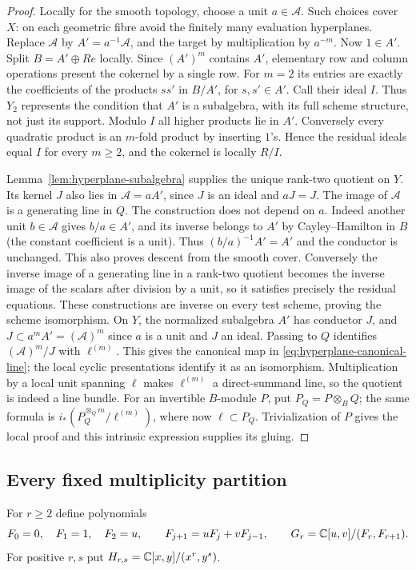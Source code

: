 \begin{proof}
Locally for the smooth topology, choose a unit $a\in\mathcal A$.
Such choices cover $X$: on each geometric fibre avoid the finitely
many evaluation hyperplanes. Replace $\mathcal A$ by
$A'=a^{-1}\mathcal A$, and the target by multiplication by $a^{-m}$.
Now $1\in A'$. Split $B=A'\oplus Re$ locally. Since $(A')^m$
contains $A'$, elementary row and column operations present the
cokernel by a single row. For $m=2$ its entries are exactly the
coefficients of the products $ss'$ in $B/A'$, for $s,s'\in A'$.
Call their ideal $I$. Thus $Y_2$ represents the condition that $A'$
is a subalgebra, with its full scheme structure, not just its support.
Modulo $I$ all higher products lie in $A'$. Conversely every
quadratic product is an $m$-fold product by inserting $1$'s.
Hence the residual ideals equal $I$ for every $m\ge2$, and the
cokernel is locally $R/I$.

Lemma~\ref{lem:hyperplane-subalgebra} supplies the unique rank-two
quotient on $Y$. Its kernel $J$ also lies in $\mathcal A=aA'$,
since $J$ is an ideal and $aJ=J$. The image of $\mathcal A$ is a
generating line in $Q$. The construction does not depend on $a$.
Indeed another unit $b\in\mathcal A$ gives $b/a\in A'$, and its
inverse belongs to $A'$ by Cayley--Hamilton in $B$ (the constant
coefficient is a unit). Thus $(b/a)^{-1}A'=A'$ and the conductor
is unchanged. This also proves descent from the smooth cover.
Conversely the inverse image of a generating line in a rank-two
quotient becomes the inverse image of the scalars after division
by a unit, so it satisfies precisely the residual equations.
These constructions are inverse on every test scheme, proving the
scheme isomorphism. On $Y$, the normalized subalgebra $A'$ has conductor $J$, and
$J\subset a^m A'=(\mathcal A)^m$ since $a$ is a unit and $J$ an ideal.
Passing to $Q$ identifies $(\mathcal A)^m/J$ with $\ell^{(m)}$.
This gives the canonical map in \eqref{eq:hyperplane-canonical-line};
the local cyclic presentations identify it as an isomorphism.
Multiplication by a local unit spanning $\ell$ makes $\ell^{(m)}$
a direct-summand line, so the quotient is indeed a line bundle.
For an invertible $B$-module $P$, put $P_Q=P\otimes_B Q$; the same
formula is $i_*(P_Q^{\otimes_Q m}/\ell^{(m)})$, where now
$\ell\subset P_Q$. Trivialization of $P$ gives the local proof and
this intrinsic expression supplies its gluing.
\end{proof}

\subsection{Every fixed multiplicity partition}
For $r\ge2$ define polynomials
\begin{equation}\label{eq:grass-recurrence}
 F_0=0,\quad F_1=1,\quad F_2=u,\qquad
 F_{j+1}=uF_j+vF_{j-1},\qquad
 G_r=\mathbb C[u,v]/(F_r,F_{r+1}).
\end{equation}
For positive $r,s$ put $H_{r,s}=\mathbb C[x,y]/(x^r,y^s)$.

